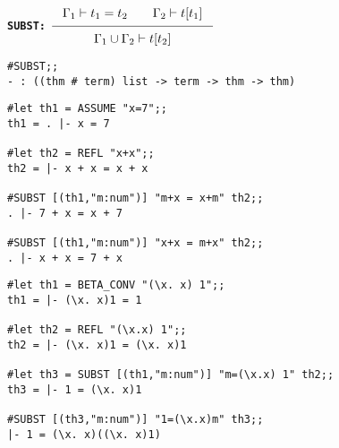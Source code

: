 \vskip5mm




\vskip10mm
\bspindent\LARGE\bf
{\Large\tt SUBST:\quad}
$\Rule{\Gamma_1 \vdash t_1 = t_2 \qquad \Gamma_2 \vdash t [ t_1 ] }
{\Gamma_1 \cup \Gamma_2 \vdash t [ t_2 ]}$
\espindent

\vskip5mm


\vskip5mm
\begin{session}\begin{verbatim}
#SUBST;;
- : ((thm # term) list -> term -> thm -> thm)
\end{verbatim}\end{session}
\vskip5mm

\vskip5mm



\vskip 4mm
\begin{session}\begin{verbatim}
#let th1 = ASSUME "x=7";;
th1 = . |- x = 7

#let th2 = REFL "x+x";;
th2 = |- x + x = x + x

#SUBST [(th1,"m:num")] "m+x = x+m" th2;;
. |- 7 + x = x + 7

#SUBST [(th1,"m:num")] "x+x = m+x" th2;;
. |- x + x = 7 + x
\end{verbatim}\end{session}
\vskip 7mm

\vskip 4mm
\begin{session}\begin{verbatim}
#let th1 = BETA_CONV "(\x. x) 1";;
th1 = |- (\x. x)1 = 1

#let th2 = REFL "(\x.x) 1";;
th2 = |- (\x. x)1 = (\x. x)1

#let th3 = SUBST [(th1,"m:num")] "m=(\x.x) 1" th2;;
th3 = |- 1 = (\x. x)1

#SUBST [(th3,"m:num")] "1=(\x.x)m" th3;;
|- 1 = (\x. x)((\x. x)1)
\end{verbatim}\end{session}


